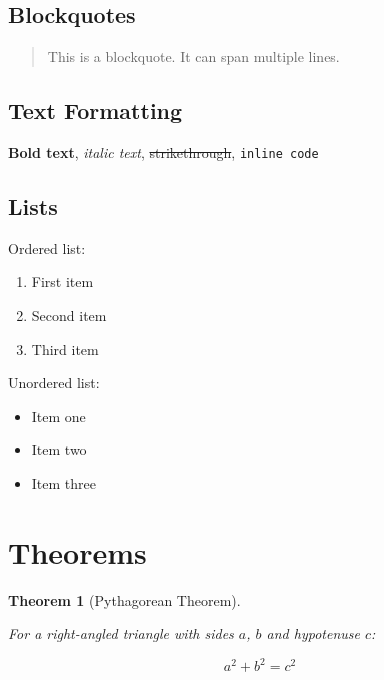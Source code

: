 \documentclass[
  letterpaper,
  oneside,
  openany]{MastersDoctoralThesis}
\providecommand{\tightlist}{%
  \setlength{\itemsep}{0pt}\setlength{\parskip}{0pt}}\usepackage{longtable,booktabs,array}
\theoremstyle{plain}
\newtheorem{theorem}{Theorem}[chapter]
\theoremstyle{remark}
\begin{document}
\subsection*{Blockquotes}\label{blockquotes}

\begin{quote}
This is a blockquote. It can span multiple lines.
\end{quote}

\subsection*{Text Formatting}\label{text-formatting}

\textbf{Bold text}, \emph{italic text}, \st{strikethrough},
\texttt{inline\ code}

\subsection*{Lists}\label{lists}

Ordered list:

\begin{enumerate}
\def\labelenumi{\arabic{enumi}.}
\tightlist
\item
  First item
\item
  Second item
\item
  Third item
\end{enumerate}

Unordered list:

\begin{itemize}
\tightlist
\item
  Item one
\item
  Item two
\item
  Item three
\end{itemize}

\section*{Theorems}\label{sec-theorems}


\begin{theorem}[Pythagorean
Theorem]\protect\hypertarget{thm-pythagorean}{}\label{thm-pythagorean}

For a right-angled triangle with sides \(a\), \(b\) and hypotenuse
\(c\):

\[a^2 + b^2 = c^2\]

\end{theorem}
\end{document}
